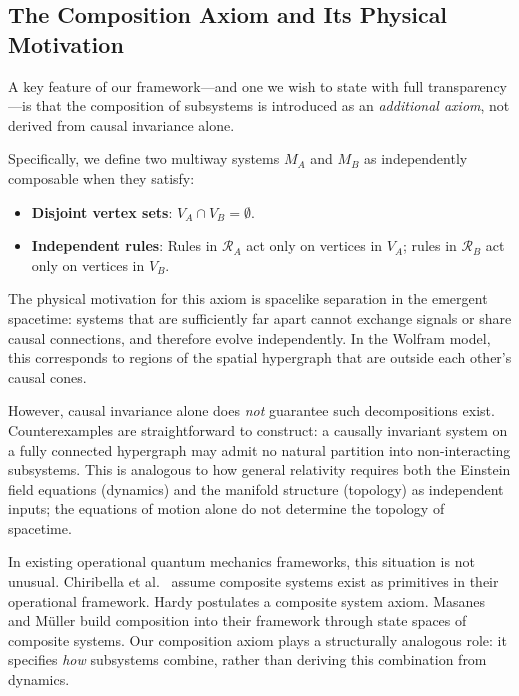 \documentclass[11pt,a4paper]{article}
\theoremstyle{definition}
\theoremstyle{remark}
\begin{document}
\subsection{The Composition Axiom and Its Physical Motivation}
\label{sec:composition_axiom}

A key feature of our framework---and one we wish to state with full
transparency---is that the composition of subsystems is introduced as an
\textit{additional axiom}, not derived from causal invariance alone.

Specifically, we define two multiway systems $M_A$ and $M_B$ as
independently composable when they satisfy:
\begin{itemize}
\item \textbf{Disjoint vertex sets}: $V_A \cap V_B = \emptyset$.
\item \textbf{Independent rules}: Rules in $\mathcal{R}_A$ act only on
  vertices in $V_A$; rules in $\mathcal{R}_B$ act only on vertices in
  $V_B$.
\end{itemize}

The physical motivation for this axiom is spacelike separation in the
emergent spacetime: systems that are sufficiently far apart cannot
exchange signals or share causal connections, and therefore evolve
independently. In the Wolfram model, this corresponds to regions of the
spatial hypergraph that are outside each other's causal cones.

However, causal invariance alone does \textit{not} guarantee such
decompositions exist. Counterexamples are straightforward to construct:
a causally invariant system on a fully connected hypergraph may admit no
natural partition into non-interacting subsystems. This is analogous to
how general relativity requires both the Einstein field equations
(dynamics) and the manifold structure (topology) as independent inputs;
the equations of motion alone do not determine the topology of spacetime.

In existing operational quantum mechanics frameworks, this situation is
not unusual. Chiribella et al.\ \cite{chiribella2011informational}
assume composite systems exist as primitives in their operational
framework. Hardy \cite{hardy2001quantum} postulates a composite system
axiom. Masanes and M\"uller \cite{masanes2011general} build composition
into their framework through state spaces of composite systems. Our
composition axiom plays a structurally analogous role: it specifies
\textit{how} subsystems combine, rather than deriving this combination
from dynamics.
\end{document}
